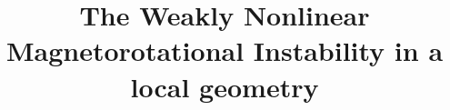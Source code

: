 \documentclass[twocolumn]{aastex61}
\begin{document}
\title{The Weakly Nonlinear Magnetorotational Instability in a local geometry}


\end{document}
